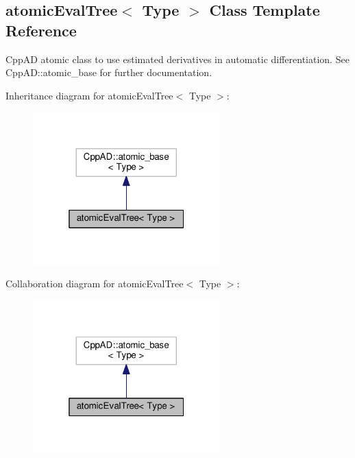 \hypertarget{classatomicEvalTree}{}\subsection{atomic\+Eval\+Tree$<$ Type $>$ Class Template Reference}
\label{classatomicEvalTree}


Cpp\+A\+D atomic class to use estimated derivatives in automatic differentiation. See Cpp\+A\+D\+::atomic\+\_\+base for further documentation.  




Inheritance diagram for atomic\+Eval\+Tree$<$ Type $>$\+:\nopagebreak
\begin{figure}[H]
\begin{center}
\leavevmode
\includegraphics[width=205pt]{classatomicEvalTree__inherit__graph}
\end{center}
\end{figure}


Collaboration diagram for atomic\+Eval\+Tree$<$ Type $>$\+:\nopagebreak
\begin{figure}[H]
\begin{center}
\leavevmode
\includegraphics[width=205pt]{classatomicEvalTree__coll__graph}
\end{center}
\end{figure}
